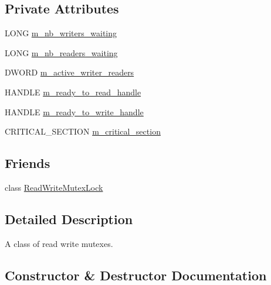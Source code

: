 \subsection*{Private Attributes}
\begin{DoxyCompactItemize}
\item 
L\+O\+NG \hyperlink{classmage_1_1_read_write_mutex_a003313794a9b43f80bd9b258b039438d}{m\+\_\+nb\+\_\+writers\+\_\+waiting}
\item 
L\+O\+NG \hyperlink{classmage_1_1_read_write_mutex_acbe7553fff7cca2656f6f2b8f0471484}{m\+\_\+nb\+\_\+readers\+\_\+waiting}
\item 
D\+W\+O\+RD \hyperlink{classmage_1_1_read_write_mutex_a1e0ad98e517236170faae5b27decfdce}{m\+\_\+active\+\_\+writer\+\_\+readers}
\item 
H\+A\+N\+D\+LE \hyperlink{classmage_1_1_read_write_mutex_a65c0ef8b687d48104b09a9d175e72236}{m\+\_\+ready\+\_\+to\+\_\+read\+\_\+handle}
\item 
H\+A\+N\+D\+LE \hyperlink{classmage_1_1_read_write_mutex_a9498ef85b52486342ba657f34369f89e}{m\+\_\+ready\+\_\+to\+\_\+write\+\_\+handle}
\item 
C\+R\+I\+T\+I\+C\+A\+L\+\_\+\+S\+E\+C\+T\+I\+ON \hyperlink{classmage_1_1_read_write_mutex_a77fe51b87e5205d60ea045fa53bc1fa3}{m\+\_\+critical\+\_\+section}
\end{DoxyCompactItemize}
\subsection*{Friends}
\begin{DoxyCompactItemize}
\item 
class \hyperlink{classmage_1_1_read_write_mutex_a9efae7e36aecae5af2a7f3cd6c4e0dbb}{Read\+Write\+Mutex\+Lock}
\end{DoxyCompactItemize}


\subsection{Detailed Description}
A class of read write mutexes. 

\subsection{Constructor \& Destructor Documentation}
\hypertarget{classmage_1_1_read_write_mutex_aa206018373d39aef48b6e465909a75a5}{}\label{classmage_1_1_read_write_mutex_aa206018373d39aef48b6e465909a75a5} 
